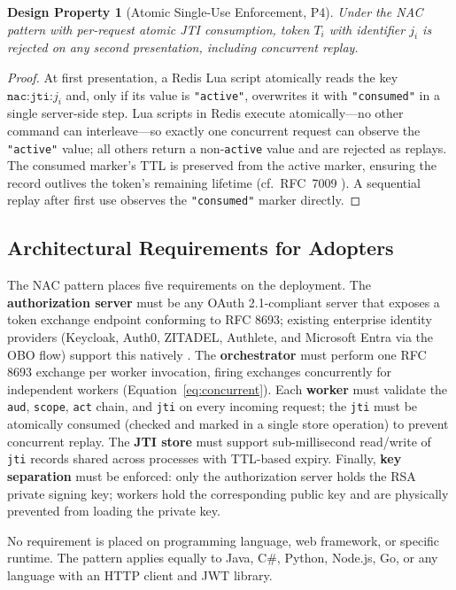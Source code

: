\documentclass[journal]{IEEEtran}
\newtheorem{theorem}{Design Property}          %
\theoremstyle{definition}
\begin{document}
\begin{theorem}[Atomic Single-Use Enforcement, P4]
\label{thm:replay}
Under the NAC pattern with per-request atomic JTI consumption, token $T_i$
with identifier $j_i$ is rejected on any second presentation, including
concurrent replay.
\end{theorem}
\begin{proof}
At first presentation, a Redis Lua script atomically reads the key
$\texttt{nac:jti:}j_i$ and, only if its value is \texttt{"active"}, overwrites
it with \texttt{"consumed"} in a single server-side step.
Lua scripts in Redis execute atomically---no other command can interleave---so
exactly one concurrent request can observe the \texttt{"active"} value; all
others return a non-\texttt{active} value and are rejected as replays.
The consumed marker's TTL is preserved from the active marker, ensuring the
record outlives the token's remaining lifetime (cf.\ RFC~7009 \cite{rfc7009}).
A sequential replay after first use observes the \texttt{"consumed"} marker
directly.
\end{proof}

\subsection{Architectural Requirements for Adopters}

The NAC pattern places five requirements on the deployment. The
\textbf{authorization server} must be any OAuth 2.1-compliant server that
exposes a token exchange endpoint conforming to RFC 8693; existing enterprise
identity providers (Keycloak, Auth0, ZITADEL, Authlete, and Microsoft Entra via
the OBO flow) support this natively \cite{rfc8693_deploy}. The
\textbf{orchestrator} must perform one RFC 8693 exchange per worker invocation,
firing exchanges concurrently for independent workers
(Equation~\ref{eq:concurrent}). Each \textbf{worker} must validate the
\texttt{aud}, \texttt{scope}, \texttt{act} chain, and \texttt{jti} on every
incoming request; the \texttt{jti} must be atomically consumed (checked and
marked in a single store operation) to prevent concurrent replay. The \textbf{JTI store} must support sub-millisecond
read/write of \texttt{jti} records shared across processes with TTL-based
expiry. Finally, \textbf{key separation} must be enforced: only the
authorization server holds the RSA private signing key; workers hold the
corresponding public key and are physically prevented from loading the private
key.

No requirement is placed on programming language, web framework, or specific
runtime. The pattern applies equally to Java, C\#, Python, Node.js, Go, or any
language with an HTTP client and JWT library.
\end{document}

